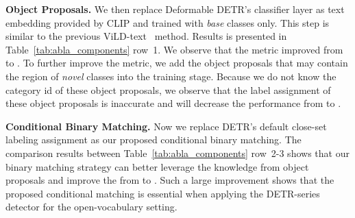 \documentclass[runningheads]{llncs}
\newcommand{\rowNumber}[1]{\textcolor{Cerulean}{#1}}
\begin{document}
\noindent \textbf{Object Proposals.}
We then replace Deformable DETR's classifier layer as text embedding provided by CLIP and trained with \emph{base} classes only.
This step is similar to the previous ViLD-text~\cite{gu2021open} method.
Results is presented in Table~\ref{tab:abla_components} row~\rowNumber{1}. We observe that the  metric improved from  to .
To further improve the  metric, we add the object proposals that may contain the region of \emph{novel} classes into the training stage.
Because we do not know the category id of these object proposals, we observe that the label assignment of these object proposals is inaccurate and will decrease the  performance from  to .

\noindent \textbf{Conditional Binary Matching.}
Now we replace DETR's default close-set labeling assignment as our proposed conditional binary matching. 
The comparison results between Table~\ref{tab:abla_components} row~\rowNumber{2-3} shows that our binary matching strategy can better leverage the knowledge from object proposals and improve the  from  to .
Such a large improvement shows that the proposed conditional matching is essential when applying the DETR-series detector for the open-vocabulary setting.
\end{document}
